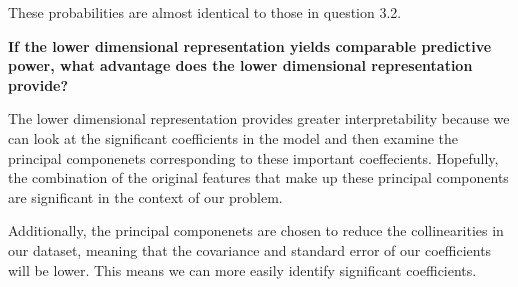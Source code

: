 \documentclass[11pt]{article}
\begin{document}
These probabilities are almost identical to those in question 3.2.

\textbf{If the lower dimensional representation yields comparable
predictive power, what advantage does the lower dimensional
representation provide?}

The lower dimensional representation provides greater interpretability
because we can look at the significant coefficients in the model and
then examine the principal componenets corresponding to these important
coeffecients. Hopefully, the combination of the original features that
make up these principal components are significant in the context of our
problem.

Additionally, the principal componenets are chosen to reduce the
collinearities in our dataset, meaning that the covariance and standard
error of our coefficients will be lower. This means we can more easily
identify significant coefficients.


    
    
    
    
\end{document}
